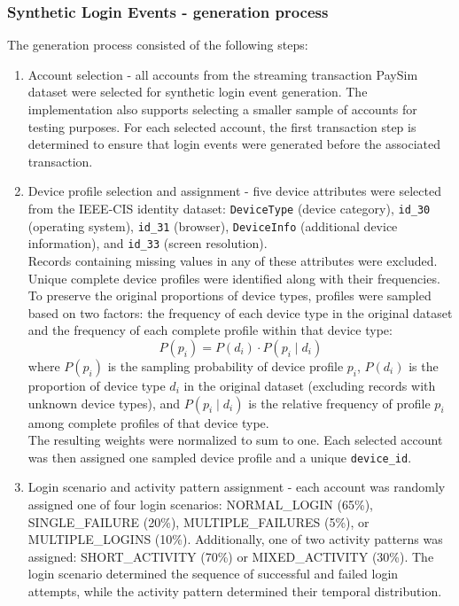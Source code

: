 \documentclass[titlepage]{article}
\begin{document}
\subsubsection{Synthetic Login Events - generation process}
The generation process consisted of the following steps:
\begin{enumerate}
    \item Account selection - all accounts from the streaming transaction PaySim dataset were selected for synthetic login event generation. The implementation also supports selecting a smaller sample of accounts for testing purposes. For each selected account, the first transaction step is determined to ensure that login events were generated before the associated transaction.
    \item Device profile selection and assignment - five device attributes were selected from the IEEE-CIS identity dataset: \texttt{DeviceType} (device category), \texttt{id\_30} (operating system), \texttt{id\_31} (browser), \texttt{DeviceInfo} (additional device information), and \texttt{id\_33} (screen resolution).\\
    Records containing missing values in any of these attributes were excluded. Unique complete device profiles were identified along with their frequencies.\\
    To preserve the original proportions of device types, profiles were sampled based on two factors: the frequency of each device type in the original dataset and the frequency of each complete profile within that device type:
    \[
        P(p_i) = P(d_i) \cdot P(p_i \mid d_i)
    \]
    where $P(p_i)$ is the sampling probability of device profile $p_i$, $P(d_i)$ is the proportion of device type $d_i$ in the original dataset (excluding records with unknown device types), and $P(p_i \mid d_i)$ is the relative frequency of profile $p_i$ among complete profiles of that device type.\\
    The resulting weights were normalized to sum to one. Each selected account was then assigned one sampled device profile and a unique \texttt{device\_id}.
    \item Login scenario and activity pattern assignment - each account was randomly assigned one of four login scenarios: NORMAL\_LOGIN (65\%), SINGLE\_FAILURE (20\%), MULTIPLE\_FAILURES (5\%), or MULTIPLE\_LOGINS (10\%). Additionally, one of two activity patterns was assigned: SHORT\_ACTIVITY (70\%) or MIXED\_ACTIVITY (30\%). The login scenario determined the sequence of successful and failed login attempts, while the activity pattern determined their temporal distribution.

\end{enumerate}
\end{document}
